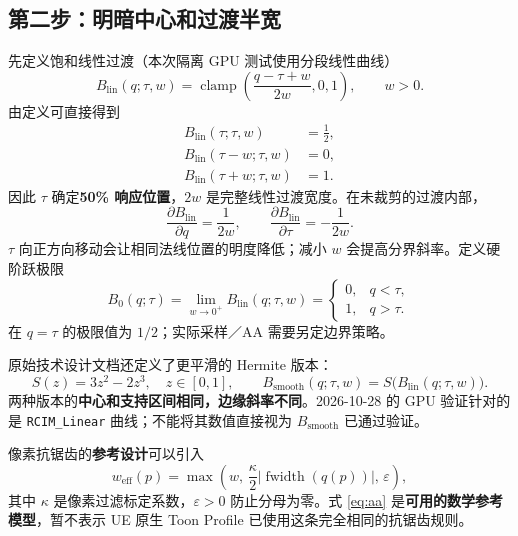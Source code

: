\documentclass[UTF8,11pt,a4paper]{ctexart}
\newcommand{\sat}[1]{\operatorname{clamp}\!\left(#1,0,1\right)}
\numberwithin{equation}{section}
\begin{document}
\subsection{第二步：明暗中心和过渡半宽}
先定义饱和线性过渡（本次隔离 GPU 测试使用分段线性曲线）
\begin{equation}
B_{\mathrm{lin}}(q;\tau,w)=
\sat{\frac{q-\tau+w}{2w}},\qquad w>0.
\label{eq:blin}
\end{equation}
由定义可直接得到
\begin{align}
B_{\mathrm{lin}}(\tau;\tau,w)&=\tfrac12,\\
B_{\mathrm{lin}}(\tau-w;\tau,w)&=0,\\
B_{\mathrm{lin}}(\tau+w;\tau,w)&=1.
\end{align}
因此 $\tau$ 确定\textbf{50\% 响应位置}，$2w$ 是完整线性过渡宽度。在未裁剪的过渡内部，
\begin{equation}
\frac{\partial B_{\mathrm{lin}}}{\partial q}=\frac{1}{2w},\qquad
\frac{\partial B_{\mathrm{lin}}}{\partial\tau}=-\frac{1}{2w}.
\end{equation}
$\tau$ 向正方向移动会让相同法线位置的明度降低；减小 $w$ 会提高分界斜率。定义硬阶跃极限
\begin{equation}
B_0(q;\tau)=\lim_{w\to0^+}B_{\mathrm{lin}}(q;\tau,w)=
\begin{cases}0,&q<\tau,\\1,&q>\tau.
\end{cases}
\end{equation}
在 $q=\tau$ 的极限值为 $1/2$；实际采样／AA 需要另定边界策略。

原始技术设计文档还定义了更平滑的 Hermite 版本：
\begin{equation}
S(z)=3z^2-2z^3,\quad z\in[0,1],\qquad
B_{\mathrm{smooth}}(q;\tau,w)=S\bigl(B_{\mathrm{lin}}(q;\tau,w)\bigr).
\label{eq:smooth}
\end{equation}
两种版本的\textbf{中心和支持区间相同，边缘斜率不同}。2026-10-28 的 GPU 验证针对的是 \texttt{RCIM\_Linear} 曲线；不能将其数值直接视为 $B_{\mathrm{smooth}}$ 已通过验证。

像素抗锯齿的\textbf{参考设计}可以引入
\begin{equation}
w_{\mathrm{eff}}(p)=\max\!\left(w,\,\frac\kappa2\left|\operatorname{fwidth}(q(p))\right|,\,\varepsilon\right),
\label{eq:aa}
\end{equation}
其中 $\kappa$ 是像素过滤标定系数，$\varepsilon>0$ 防止分母为零。式 \eqref{eq:aa} 是\textbf{可用的数学参考模型}，暂不表示 UE 原生 Toon Profile 已使用这条完全相同的抗锯齿规则。
\end{document}
